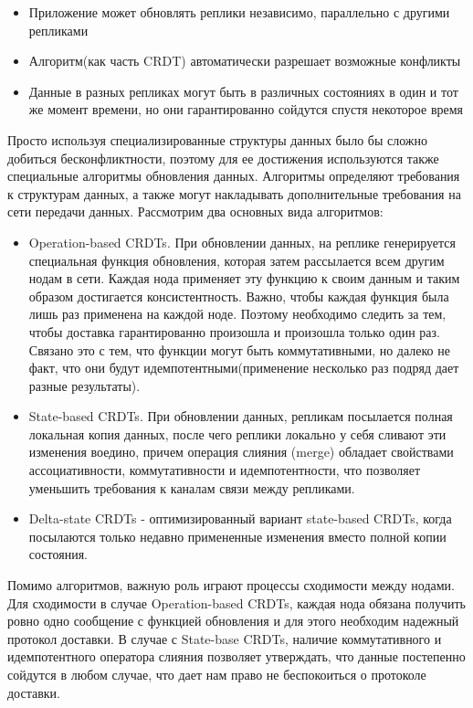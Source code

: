 \begin{itemize}
    \item Приложение может обновлять реплики независимо, параллельно с другими репликами
    \item Алгоритм(как часть CRDT) автоматически разрешает возможные конфликты
    \item Данные в разных репликах могут быть в различных состояниях в один и тот же момент времени, но они гарантированно сойдутся спустя некоторое время 
\end{itemize}
Просто используя специализированные структуры данных было бы сложно добиться бесконфликтности, поэтому для ее достижения используются также специальные алгоритмы обновления данных. Алгоритмы определяют требования к структурам данных, а также могут накладывать дополнительные требования на сети передачи данных. Рассмотрим два основных вида алгоритмов:
\begin{itemize}
    \item Operation-based CRDTs. При обновлении данных, на реплике генерируется специальная функция обновления, которая затем рассылается всем другим нодам в сети. Каждая нода применяет эту функцию к своим данным и таким образом достигается консистентность. Важно, чтобы каждая функция была лишь раз применена на каждой ноде. Поэтому необходимо следить за тем, чтобы доставка гарантированно произошла и произошла только один раз. Связано это с тем, что функции могут быть коммутативными, но далеко не факт, что они будут идемпотентными(применение несколько раз подряд дает разные результаты).
    \item State-based CRDTs. При обновлении данных, репликам посылается полная локальная копия данных, после чего реплики локально у себя сливают эти изменения воедино, причем операция слияния (merge) обладает свойствами ассоциативности, коммутативности и идемпотентности, что позволяет уменьшить требования к каналам связи между репликами. 
    \item Delta-state CRDTs - оптимизированный вариант state-based CRDTs, когда посылаются только недавно примененные изменения вместо полной копии состояния.
\end{itemize}
Помимо алгоритмов, важную роль играют процессы сходимости между нодами. Для сходимости в случае Operation-based CRDTs, каждая нода обязана получить ровно одно сообщение с функцией обновления и для этого необходим надежный протокол доставки. В случае с State-base CRDTs, наличие коммутативного и идемпотентного оператора слияния позволяет утверждать, что данные постепенно сойдутся в любом случае, что дает нам право не беспокоиться о протоколе доставки. 
